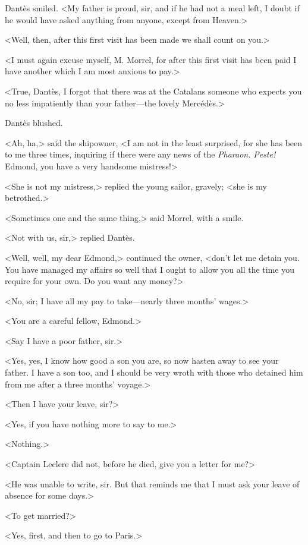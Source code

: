  Dantès smiled. <My father is proud, sir, and if he had not a meal left, I doubt if he would have asked anything from anyone, except from Heaven.> 

 <Well, then, after this first visit has been made we shall count on you.> 

 <I must again excuse myself, M. Morrel, for after this first visit has been paid I have another which I am most anxious to pay.> 

 <True, Dantès, I forgot that there was at the Catalans someone who expects you no less impatiently than your father—the lovely Mercédès.> 

 Dantès blushed. 

 <Ah, ha,> said the shipowner, <I am not in the least surprised, for she has been to me three times, inquiring if there were any news of the \textit{Pharaon.} \textit{Peste!} Edmond, you have a very handsome mistress!> 

 <She is not my mistress,> replied the young sailor, gravely; <she is my betrothed.> 

 <Sometimes one and the same thing,> said Morrel, with a smile. 

 <Not with us, sir,> replied Dantès. 

 <Well, well, my dear Edmond,> continued the owner, <don't let me detain you. You have managed my affairs so well that I ought to allow you all the time you require for your own. Do you want any money?> 

 <No, sir; I have all my pay to take—nearly three months' wages.> 

 <You are a careful fellow, Edmond.> 

 <Say I have a poor father, sir.> 

 <Yes, yes, I know how good a son you are, so now hasten away to see your father. I have a son too, and I should be very wroth with those who detained him from me after a three months' voyage.> 

 <Then I have your leave, sir?> 

 <Yes, if you have nothing more to say to me.> 

 <Nothing.> 

 <Captain Leclere did not, before he died, give you a letter for me?> 

 <He was unable to write, sir. But that reminds me that I must ask your leave of absence for some days.> 

 <To get married?> 

 <Yes, first, and then to go to Paris.> 


